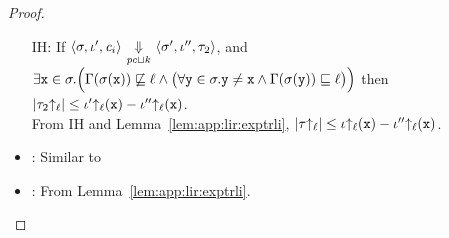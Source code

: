 \begin{proof}
\begin{itemize}[leftmargin=.5in]
      IH: If $\langle \sigma, \iota', \mathit{c}_i \rangle
      {~\underset{\mathit{pc}\sqcup k}{\Downarrow}~} \langle \sigma', \iota'', \tau_2 \rangle$, and\\
      $\exists \texttt{x} \in \sigma. \Big(\Gamma(\sigma(\texttt{x}))
      \not\sqsubseteq \ell \wedge \big(\forall \texttt{y} \in \sigma. \texttt{y} \neq \texttt{x} \wedge
      \Gamma(\sigma(\texttt{y})) \sqsubseteq \ell\big)\Big)$  then 
      $|\tau_2{\uparrow_\ell}| \leq \iota'{\uparrow_\ell}(\texttt{x}) - \iota''{\uparrow_\ell}(\texttt{x})$. \\
      From IH and Lemma~\ref{lem:app:lir:exptrli}, $|\tau{\uparrow_\ell}| \leq
      \iota{\uparrow_\ell}(\texttt{x}) - \iota''{\uparrow_\ell}(\texttt{x})$. 
    \item{}: Similar to 
    \item{}: From Lemma~\ref{lem:app:lir:exptrli}.
  \end{itemize}
\end{proof}

